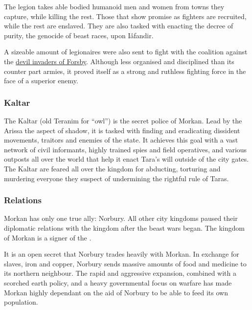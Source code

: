 The legion takes able bodied humanoid men and women from towns they
capture, while killing the rest. Those that show promise as fighters are
recruited, while the rest are enslaved. They are also tasked with enacting the
decree of purity, the genocide of beast races, upon Iâfandir.

A sizeable amount of legionaires were also sent to fight with the coalition
against the \hyperref[sec:Devil Siege]{devil invaders of Forsby}. Although
less organised and disciplined than its counter part armies, it proved itself
as a strong and ruthless fighting force in the face of a superior enemy.

\subsubsection{Kaltar}
\label{sec:Kaltar}

The Kaltar (old Teranim for ``owl'') is the secret police of Morkan. Lead by
the Arissa the aspect of shadow, it is tasked with finding and eradicating
dissident movements, traitors and enemies of the state.  It achieves this goal
with a vast network of civil informants, highly trained spies and field
operatives, and various outposts all over the world that help it enact Tara's
will outside of the city gates. The Kaltar are feared all over the kingdom for
abducting, torturing and murdering everyone they suspect of undermining the
rightful rule of Taras.

\subsubsection{Relations}

Morkan has only one true ally: Norbury. All other city kingdoms paused their
diplomatic relations with the kingdom after the beast wars began. The kingdom
of Morkan is a signer of the .

It is an open secret that Norbury trades heavily with Morkan. In exchange for
slaves, iron and copper, Norbury sends massive amounts of food and medicine to
its northern neighbour. The rapid and aggressive expansion, combined with a
scorched earth policy, and a heavy governmental focus on warfare has made
Morkan highly dependant on the aid of Norbury to be able to feed its own
population.
